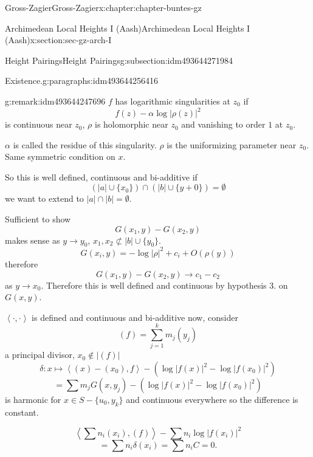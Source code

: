 \documentclass[oneside,10pt,]{book}
\numberwithin{equation}{section}
\newcommand{\pair}[2]{\left\langle #1, #2 \right\rangle}
\begin{document}
\begin{chapterptx}{Gross-Zagier}{}{Gross-Zagier}{}{}{x:chapter:chapter-buntes-gz}
\begin{sectionptx}{Archimedean Local Heights I (Aash)}{}{Archimedean Local Heights I (Aash)}{}{}{x:section:sec-gz-arch-I}
\begin{subsectionptx}{Height Pairings}{}{Height Pairings}{}{}{g:subsection:idm493644271984}
\begin{paragraphs}{Existence.}{g:paragraphs:idm493644256416}
\begin{remark}{}{g:remark:idm493644247696}
\(f\) has logarithmic singularities at \(z_0\) if%
\begin{equation*}
f(z) - \alpha \log|\rho (z)|^2
\end{equation*}
is continuous near \(z_0\), \(\rho \) is holomorphic near \(z_0\) and vanishing to order \(1\) at \(z_0\).%
\par
\(\alpha \) is called the residue of this singularity. \(\rho \) is the uniformizing parameter near \(z_0\). Same symmetric condition on \(x\).%
\end{remark}
So this is well defined, continuous and bi-additive if%
\begin{equation*}
(|a| \cup\{x_0\}) \cap (|b| \cup \{y+0\} ) = \emptyset
\end{equation*}
we want to extend to \(|a|\cap |b| = \emptyset\).%
\par
Sufficient to show%
\begin{equation*}
G(x_1,y) -G(x_2,y)
\end{equation*}
makes sense as \(y\to y_0\), \(x_1, x_2 \not \subset |b| \cup\{y_0\}\).%
\begin{equation*}
G(x_i, y) = - \log|\rho |^2 + c_i + O(\rho (y))
\end{equation*}
therefore%
\begin{equation*}
G(x_1,y) - G(x_2,y) \to c_1  - c_2
\end{equation*}
as \(y \to x_0\). Therefore this is well defined and continuous by hypothesis 3. on \(G(x,y)\).%
\par
\(\pair\cdot\cdot\) is defined and continuous and bi-additive now, consider%
\begin{equation*}
(f) = \sum_{j=1}^ k m_j (y_j)
\end{equation*}
a principal divisor, \(x_0 \not \in |(f)|\)%
\begin{equation*}
\delta \colon x\mapsto \pair {(x) - (x_0) }{f} - \left(\log|f(x)|^2 - \log|f(x_0)|^2\right)
\end{equation*}
%
\begin{equation*}
= \sum m_j G(x,y_j) - \left( \log|f(x)| ^2 - \log|f(x_0)|^2\right)
\end{equation*}
is harmonic for \(x \in S - \{u_0, y_k\}\) and continuous everywhere so the difference is constant.%
\par
%
\begin{equation*}
\pair {\sum n_i(x_i)}{(f)} - \sum n_i \log|f(x_i)|^2
\end{equation*}
%
\begin{equation*}
=\sum n_i \delta (x_i) = \sum n_i C = 0\text{.}

\end{equation*}
\end{paragraphs}
\end{subsectionptx}
\end{sectionptx}
\end{chapterptx}
\end{document}
